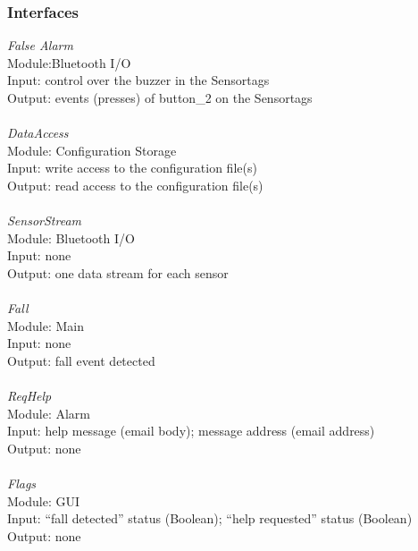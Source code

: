 \documentclass[conference,12pt]{IEEETran}
\begin{document}
\subsubsection{Interfaces}
\textit{False Alarm}
\\Module:Bluetooth I/O
\\Input: control over the buzzer in the Sensortags
\\Output: events (presses) of button\_2 on the Sensortags
\\\\\textit{DataAccess}
\\Module: Configuration Storage
\\Input: write access to the configuration file(s)
\\Output: read access to the configuration file(s)
\\\\\textit{SensorStream}
\\Module: Bluetooth I/O
\\Input: none
\\Output: one data stream for each sensor
\\\\\textit{Fall}
\\Module: Main
\\Input: none
\\Output: fall event detected
\\\\\textit{ReqHelp}
\\Module: Alarm
\\Input: help message (email body); message address (email address)
\\Output: none
\\\\\textit{Flags}
\\Module: GUI
\\Input: “fall detected” status (Boolean); “help requested” status (Boolean)
\\Output: none
\end{document}
